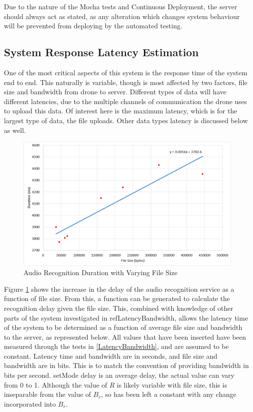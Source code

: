 \documentclass{article}
\begin{document}
Due to the nature of the Mocha tests and Continuous Deployment, the server should always act as stated, as any alteration which changes system behaviour will be prevented from deploying by the automated testing.



\subsection{System Response Latency Estimation}
One of the most critical aspects of this system is the response time of the system end to end. This naturally is variable, though is most affected by two factors, file size and bandwidth from drone to server. Different types of data will have different latencies, due to the multiple channels of communication the drone uses to upload this data. Of interest here is the maximum latency, which is for the largest type of data, the file uploads. Other data types latency is discussed below as well.

\begin{figure}[h]
\caption{Audio Recognition Duration with Varying File Size\label{fig:RecognitionDuration}}
\includegraphics[width=\textwidth]{RecognitionDuration}
\end{figure}

Figure \ref{fig:RecognitionDuration} shows the increase in the delay of the audio recognition service as a function of file size. From this, a function can be generated to calculate the recognition delay given the file size. This, combined with knowledge of other parts of the system investigated in ref{LatencyBandwidth}, allows the latency time of the system to be determined as a function of average file size and bandwidth to the server, as represented below. All values that have been inserted have been measured through the tests in \ref{LatencyBandwidth}, and are assumed to be constant. Latency time and bandwidth are in seconds, and file size and bandwidth are in bits. This is to match the convention of providing bandwidth in bits per second. setMode delay is an average delay, the actual value can vary from 0 to 1. Although the value of $R$ is likely variable with file size, this is inseparable from the value of $B_r$, so has been left a constant with any change incorporated into $B_r$.
\end{document}

